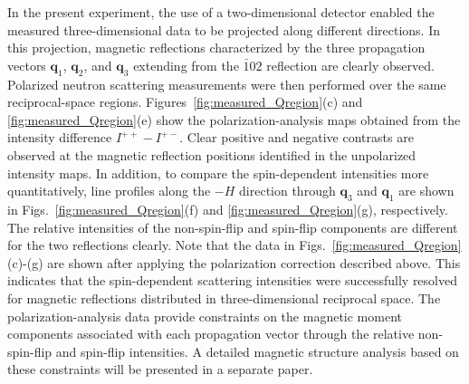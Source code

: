 \documentclass[%
 reprint,
superscriptaddress,
 amsmath,amssymb,
 aps,
]{revtex4-2}
\begin{document}
In the present experiment, the use of a two-dimensional detector enabled the measured three-dimensional data to be projected along different directions.
In this projection, magnetic reflections characterized by the three propagation vectors \(\boldsymbol{q}_1\), \(\boldsymbol{q}_2\), and \(\boldsymbol{q}_3\) extending from the \(\bar{1}02\) reflection are clearly observed.
Polarized neutron scattering measurements were then performed over the same reciprocal-space regions.
Figures~\ref{fig:measured_Qregion}(c) and \ref{fig:measured_Qregion}(e) show the polarization-analysis maps obtained from the intensity difference \(I^{++}-I^{+-}\).
Clear positive and negative contrasts are observed at the magnetic reflection positions identified in the unpolarized intensity maps.
In addition, to compare the spin-dependent intensities more quantitatively, line profiles along the \(-H\) direction through \(\boldsymbol{q}_3\) and \(\boldsymbol{q}_1\) are shown in Figs.~\ref{fig:measured_Qregion}(f) and \ref{fig:measured_Qregion}(g), respectively.
The relative intensities of the non-spin-flip and spin-flip components are different for the two reflections clearly.
Note that the data in Figs.~\ref{fig:measured_Qregion}(c)-(g) are shown after applying the polarization correction described above.
This indicates that the spin-dependent scattering intensities were successfully resolved for magnetic reflections distributed in three-dimensional reciprocal space.
The polarization-analysis data provide constraints on the magnetic moment components associated with each propagation vector through the relative non-spin-flip and spin-flip intensities.
A detailed magnetic structure analysis based on these constraints will be presented in a separate paper.
\end{document}

